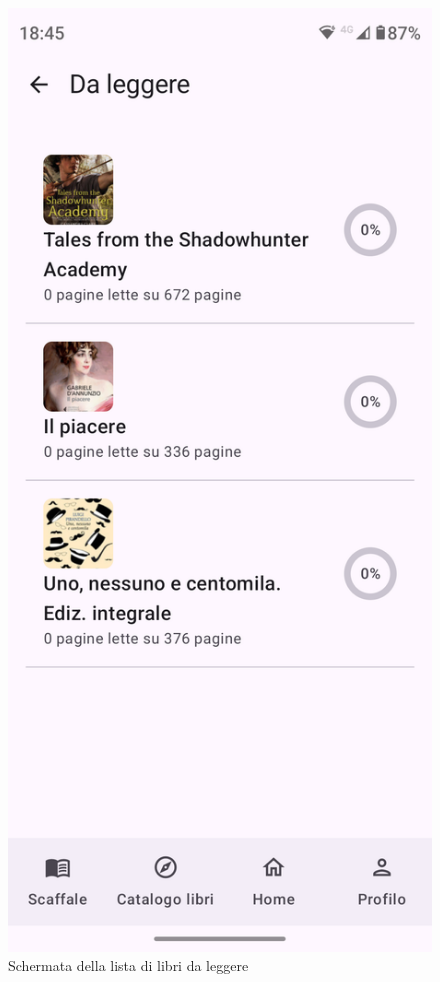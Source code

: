 \documentclass{article}
\begin{document}
\begin{figure}[H]
  \centering
  \includegraphics[width=0.6\linewidth]{to-read-shelf.png}
  \caption{Schermata della lista di libri da leggere}
  \label{fig:sitemap}
\end{figure}
\end{document}
